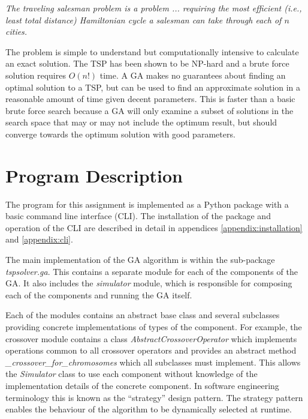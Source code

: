 \documentclass[journal]{IEEEtran}
\begin{document}
\begin{displayquote}
\textit{The traveling salesman problem is a problem ... requiring the most efficient (i.e., least total distance) Hamiltonian cycle a salesman can take through each of $n$ cities.}\cite{weisstein2006traveling}
\end{displayquote}

The problem is simple to understand but computationally intensive to calculate an exact solution. The TSP has been shown to be NP-hard \cite{weisstein2006traveling} and a brute force solution requires $O(n!)$ time.  A GA makes no guarantees about finding an optimal solution to a TSP, but can be used to find an approximate solution in a reasonable amount of time given decent parameters. This is faster than a basic brute force search because a GA will only examine a subset of solutions in the search space that may or may not include the optimum result, but should converge towards the optimum solution with good parameters.

\section{Program Description}
The program for this assignment is implemented as a Python package with a basic command line interface (CLI). The installation of the package and operation of the CLI are described in detail in appendices \ref{appendix:installation} and \ref{appendix:cli}.

The main implementation of the GA algorithm is within the sub-package \textit{tspsolver.ga}. This contains a separate module for each of the components of the GA. It also includes the \textit{simulator} module, which is responsible for composing each of the components and running the GA itself.

Each of the modules contains an abstract base class and several subclasses providing concrete implementations of types of the component. For example, the crossover module contains a class \textit{AbstractCrossoverOperator} which implements operations common to all crossover operators and provides an abstract method \textit{\_crossover\_for\_chromosomes} which all subclasses must implement. This allows the \textit{Simulator} class to use each component without knowledge of the implementation details of the concrete component. In software engineering terminology this is known as the ``strategy'' design pattern. The strategy pattern enables the behaviour of the algorithm to be dynamically selected at runtime. 
\end{document}
